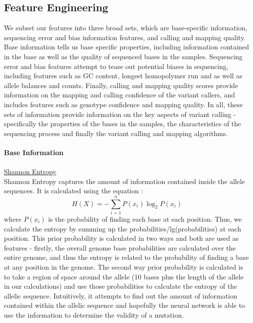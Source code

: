 \documentclass{article}
\begin{document}
\subsection{Feature Engineering}
We subset our features into three broad sets, which are base-specific information, sequencing error and bias information features, and calling and mapping quality. Base information tells us base specific properties, including information contained in the base as well as the quality of sequenced bases in the samples. Sequencing error and bias features attempt to tease out potential biases in sequencing, including features such as GC content, longest homopolymer run and as well as allele balances and counts. Finally, calling and mapping quality scores provide information on the mapping and calling confidence of the variant callers, and includes features such as genotype confidence and mapping quality. In all, these sets of information provide information on the key aspects of variant calling - specifically the properties of the bases in the samples, the characteristics of the sequencing process and finally the variant calling and mapping algorithms.\\\\
\textbf{Base Information} \\\\
\underline{Shannon Entropy}\\
Shannon Entropy captures the amount of information contained inside the allele sequences. It is calculated using the equation :
\begin{equation}
H(X) = -\sum_{i=1}^{n}P(x_i)\log_{2}P(x_i)
\end{equation}
where $P(x_i)$ is the probability of finding each base at each position. Thus, we calculate the entropy by summing up the probabilities/lg(probabilities) at each position. This prior probability is calculated in two ways and both are used as features - firstly, the overall genome base probabilities are calculated over the entire genome, and thus the entropy is related to the probability of finding a base at any position in the genome. The second way prior probability is calculated is to take a region of space around the allele (10 bases plus the length of the allele in our calculations) and use those probabilities to calculate the entropy of the allelic sequence. Intuitively, it attempts to find out the amount of information contained within the allelic sequence and hopefully the neural network is able to use the information to determine the validity of a mutation.\\\\
\end{document}
